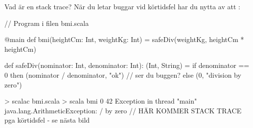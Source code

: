 \begin{Slide}{Vad är en stack trace?}\SlideFontSmall
När du letar buggar vid körtidsfel har du nytta av att   :


  
\begin{Code}
// Program i filen bmi.scala

@main 
def bmi(heightCm: Int, weightKg: Int) = 
  safeDiv(weightKg, heightCm * heightCm) 

def safeDiv(nominator: Int, denominator: Int): (Int, String) = 
  if denominator == 0 then (nominator / denominator, "ok")  // ser du buggen?
  else (0, "division by zero")

\end{Code}
\begin{REPL}
> scalac bmi.scala 
> scala bmi 0 42
Exception in thread "main" java.lang.ArithmeticException: / by zero
        // HÄR KOMMER STACK TRACE pga körtidsfel - se nästa bild
\end{REPL}
\end{Slide}

